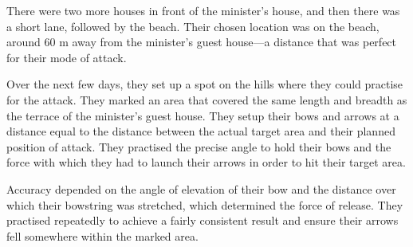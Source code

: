 There were two more houses in front of the minister's house, and then there was
a short lane, followed by the beach. Their chosen location was on the beach,
around 60 m away from the minister's guest house—a distance that was perfect
for their mode of attack.

Over the next few days, they set up a spot on the hills where they could practise
for the attack. They marked an area that covered the same length and breadth as the terrace of the minister's guest house. They setup their bows and arrows at a
distance equal to the distance between the actual target area and their planned
position of attack. They practised the precise angle to hold their bows and the
force with which they had to launch their arrows in order to hit their target area.

Accuracy depended on the angle of elevation of their bow and the distance over which their bowstring was stretched, which determined the force of release. They practised repeatedly
to achieve a fairly consistent result and ensure their arrows fell
somewhere within the marked area.